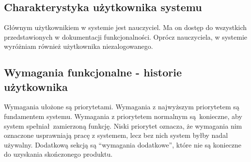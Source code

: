 \documentclass[polish,12pt]{aghthesis}
\author{Andrzej Sołtysik}
\date{\the\year}
\begin{document}
\maketitle

\section{\SectionTitleProjectVision}
\label{sec:cel-wizja}

\section{\SectionTitleScope}
\label{sec:zakres-funkcjonalnosci}

\subsection{Charakterystyka użytkownika systemu}

Głównym użytkownikiem w systemie jest nauczyciel. Ma on dostęp do wszystkich przedstawionych w dokumentacji funkcjonalności. Oprócz nauczyciela, w systemie wyróżniam również użytkownika niezalogowanego. 

\subsection{Wymagania funkcjonalne - historie użytkownika}

Wymagania ułożone są priorytetami. Wymagania z najwyższym priorytetem są fundamentem systemu. Wymagania z priorytetem normalnym są konieczne, aby system spełniał zamierzoną funkcję. Niski priorytet oznacza, że wymagania nim oznaczone usprawniają pracę z systemem, lecz bez nich system byłby nadal używalny. Dodatkową sekcją są ``wymagania dodatkowe'', które nie są konieczne do uzyskania skończonego produktu.
\end{document}
